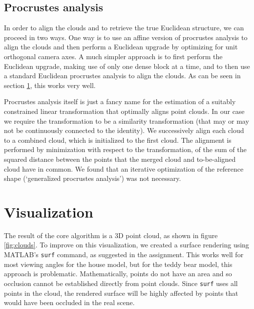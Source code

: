 \documentclass[a4paper,10pt]{article}
\begin{document}
\subsection{Procrustes analysis}

In order to align the clouds and to retrieve the true Euclidean structure, we can proceed in two ways.
One way is to use an affine version of procrustes analysis to align the clouds and then perform a Euclidean upgrade by optimizing for unit orthogonal camera axes.
A much simpler approach is to first perform the Euclidean upgrade, making use of only one dense block at a time, and to then use a standard Euclidean procrustes analysis to align the clouds.
As can be seen in section \ref{sec:vis}, this works very well.

Procrustes analysis itself is just a fancy name for the estimation of a suitably constrained linear transformation that optimally aligns point clouds.
In our case we require the transformation to be a similarity transformation (that may or may not be continuously connected to the identity).
We successively align each cloud to a combined cloud, which is initialized to the first cloud.
The alignment is performed by minimization with respect to the transformation, of the sum of the squared distance between the points that the merged cloud and to-be-aligned cloud have in common.
We found that an iterative optimization of the reference shape (`generalized procrustes analysis') was not necessary.

\section{Visualization}
\label{sec:vis}
The result of the core algorithm is a 3D point cloud, as shown in figure \ref{fig:clouds}.
To improve on this visualization, we created a surface rendering using MATLAB's \verb+surf+ command, as suggested in the assignment.
This works well for most viewing angles for the house model, but for the teddy bear model, this approach is problematic.
Mathematically, points do not have an area and so occlusion cannot be established directly from point clouds.
Since \verb+surf+ uses all points in the cloud, the rendered surface will be highly affected by points that would have been occluded in the real scene.
\end{document}

